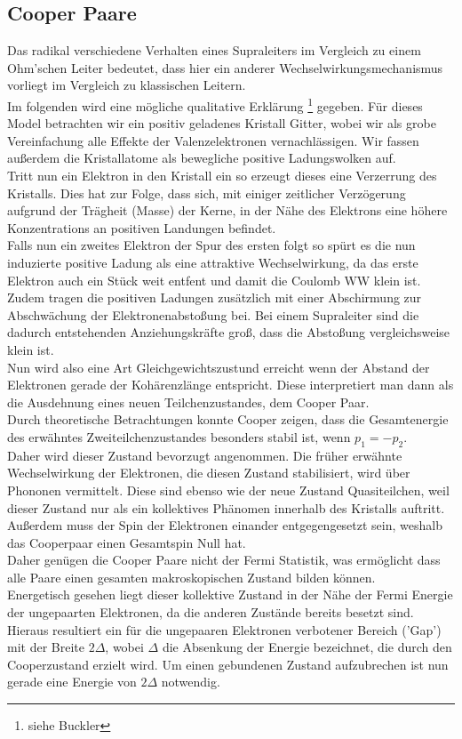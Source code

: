 \documentclass[twoside,        %
               BCOR12mm,       %
               english,ngerman, %
               fleqn,headsepline=false,footsepline=false
              ]{MFPREPORT}
\begin{document}
\subsection{Cooper Paare}
Das radikal verschiedene Verhalten eines Supraleiters im Vergleich zu einem Ohm'schen Leiter bedeutet, dass hier ein anderer Wechselwirkungsmechanismus vorliegt im Vergleich zu klassischen Leitern.
\\
Im folgenden wird eine mögliche qualitative Erklärung
\footnote{siehe Buckler}
gegeben. 
Für dieses Model betrachten wir ein positiv geladenes Kristall Gitter, wobei wir als grobe Vereinfachung alle Effekte der Valenzelektronen vernachlässigen.
Wir fassen außerdem die Kristallatome als bewegliche positive Ladungswolken auf.
\\
Tritt nun ein Elektron in den Kristall ein so erzeugt dieses eine Verzerrung des Kristalls.
Dies hat zur Folge, dass sich, mit einiger zeitlicher Verzögerung aufgrund der Trägheit (Masse) der Kerne, in der Nähe des Elektrons eine höhere Konzentrations an positiven Landungen befindet. 
\\
Falls nun ein zweites Elektron der Spur des ersten folgt so spürt es die nun induzierte positive Ladung als eine attraktive Wechselwirkung, da das erste Elektron auch ein Stück weit entfent und damit die Coulomb WW klein ist. Zudem tragen die positiven Ladungen zusätzlich mit einer Abschirmung zur Abschwächung der Elektronenabstoßung bei.
Bei einem Supraleiter sind die dadurch entstehenden Anziehungskräfte groß, dass die Abstoßung vergleichsweise klein ist.
\\
Nun wird also eine Art Gleichgewichtszustund erreicht wenn der Abstand der Elektronen gerade der Kohärenzlänge entspricht. 
Diese interpretiert man dann als die Ausdehnung eines neuen Teilchenzustandes, dem Cooper Paar.
\\
Durch theoretische Betrachtungen konnte Cooper zeigen, dass die Gesamtenergie des erwähntes Zweiteilchenzustandes besonders stabil ist, wenn $p_1 = -p_2$. 
\\
Daher wird dieser Zustand bevorzugt angenommen.
Die früher erwähnte Wechselwirkung der Elektronen, die diesen Zustand stabilisiert, wird über Phononen vermittelt.
Diese sind ebenso wie der neue Zustand Quasiteilchen, weil dieser Zustand nur als ein kollektives Phänomen innerhalb des Kristalls auftritt.
Außerdem muss der Spin der Elektronen einander entgegengesetzt sein, weshalb das Cooperpaar einen Gesamtspin Null hat.
\\
Daher genügen die Cooper Paare nicht der Fermi Statistik, was ermöglicht dass alle Paare einen gesamten makroskopischen Zustand bilden können.
\\
Energetisch gesehen liegt dieser kollektive Zustand in der Nähe der Fermi Energie der ungepaarten Elektronen,
da die anderen Zustände bereits besetzt sind.
\\
Hieraus resultiert ein für die ungepaaren Elektronen verbotener Bereich ('Gap') mit der Breite $2 \Delta$, wobei $\Delta$ die Absenkung der Energie bezeichnet, die durch den Cooperzustand erzielt wird.
Um einen gebundenen Zustand aufzubrechen ist nun gerade eine Energie von $2 \Delta$ notwendig.
\end{document}
